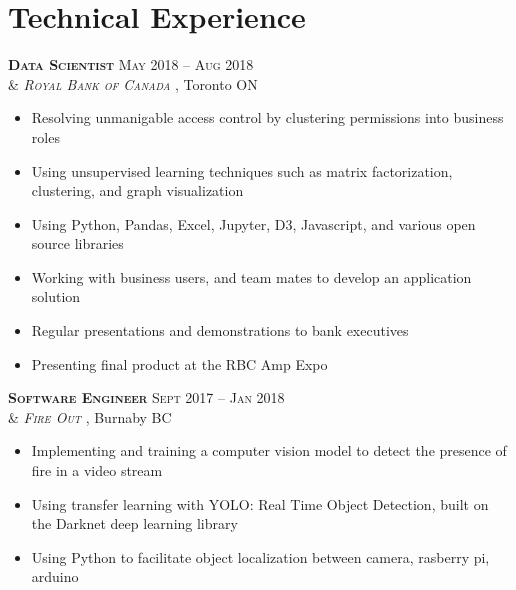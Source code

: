 \documentclass[10pt]{article} %
\begin{document}
\hfill
\begin{minipage}[t]{0.52\textwidth} %
\vspace{0pt} %



\section{Technical Experience} 


{\raggedright\textsc{\textbf{Data Scientist} \hfill May 2018 -- Aug 2018\\
& \textit{Royal Bank of Canada }}, Toronto ON}
\begin{itemize}
\item Resolving unmanigable access control by clustering permissions into business roles
\item Using unsupervised learning techniques such as matrix factorization, clustering, and graph visualization
\item Using Python, Pandas, Excel, Jupyter, D3, Javascript, and various open source libraries
\item Working with business users, and team mates to develop an application solution
\item Regular presentations and demonstrations to bank executives
\item Presenting final product at the RBC Amp Expo
\end{itemize} 


{\raggedright\textsc{\textbf{Software Engineer} \hfill Sept 2017 -- Jan 2018\\
& \textit{Fire Out }}, Burnaby BC} 
\begin{itemize}
\item Implementing and training a computer vision model to detect the presence of fire in a video stream
\item Using transfer learning with YOLO: Real Time Object Detection, built on the Darknet deep learning library
\item Using Python to facilitate object localization between camera, rasberry pi, arduino
\end{itemize} 


\end{minipage}
\end{document}
